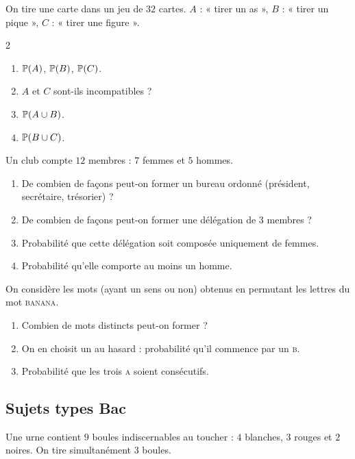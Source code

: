On tire une carte dans un jeu de $32$ cartes. $A$ : « tirer un as »,
$B$ : « tirer un pique », $C$ : « tirer une figure ».
\begin{multicols}{2}
\begin{enumerate}
	\item $\mathbb{P}(A)$, $\mathbb{P}(B)$, $\mathbb{P}(C)$.
	\item $A$ et $C$ sont-ils incompatibles ?
	\item $\mathbb{P}(A\cup B)$.
	\item $\mathbb{P}(B\cup C)$.
\end{enumerate}
\end{multicols}

Un club compte $12$ membres : $7$ femmes et $5$ hommes.
\begin{enumerate}
	\item De combien de façons peut-on former un bureau ordonné
	(président, secrétaire, trésorier) ?
	\item De combien de façons peut-on former une délégation de $3$ membres ?
	\item Probabilité que cette délégation soit composée uniquement de femmes.
	\item Probabilité qu'elle comporte au moins un homme.
\end{enumerate}

On considère les mots (ayant un sens ou non) obtenus en permutant les lettres
du mot \textsc{banana}.
\begin{enumerate}
	\item Combien de mots distincts peut-on former ?
	\item On en choisit un au hasard : probabilité qu'il commence par un
	\textsc{b}.
	\item Probabilité que les trois \textsc{a} soient consécutifs.
\end{enumerate}

\subsection{Sujets types Bac}

Une urne contient $9$ boules indiscernables au toucher : $4$ blanches,
$3$ rouges et $2$ noires. On tire simultanément $3$ boules.

